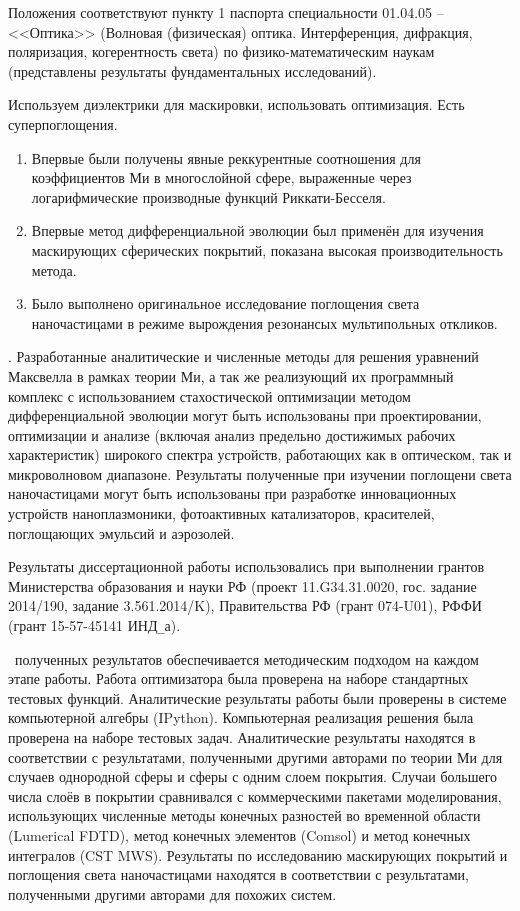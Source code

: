 Положения соответствуют пункту 1 паспорта специальности 01.04.05 --
<<Оптика>> (Волновая (физическая) оптика. Интерференция, дифракция,
поляризация, когерентность света) по физико-математическим
наукам (представлены результаты фундаментальных исследований).

\novelty Используем диэлектрики для маскировки, использовать
оптимизация. Есть суперпоглощения.
\begin{enumerate}
  \item Впервые были получены явные реккурентные соотношения для
    коэффициентов Ми в многослойной сфере, выраженные через
    логарифмические производные функций Риккати-Бесселя. 
  \item Впервые метод дифференциальной эволюции был применён
    для изучения маскирующих сферических покрытий, показана высокая
    производительность метода.
  \item Было выполнено оригинальное исследование поглощения света
    наночастицами в режиме вырождения резонансых мультипольных откликов.
\end{enumerate}

\influence. Разработанные аналитические и численные методы для решения
уравнений Максвелла в рамках теории Ми, а так же реализующий их
программный комплекс с использованием стахостической оптимизации
методом дифференциальной эволюции могут быть использованы при
проектировании, оптимизации и анализе (включая анализ предельно
достижимых рабочих характеристик) широкого спектра устройств,
работающих как в оптическом, так и микроволновом диапазоне. Результаты
полученные при изучении поглощени света наночастицами могут быть
использованы при разработке инновационных устройств наноплазмоники,
фотоактивных катализаторов, красителей, поглощающих эмульсий и
аэрозолей.

Результаты диссертационной работы использовались при выполнении
грантов Министерства образования и науки РФ
(проект 11.G34.31.0020, гос. задание 2014/190, задание 3.561.2014/K),
Правительства РФ (грант 074-U01), РФФИ (грант 15-57-45141 ИНД\verb+_+а).


\reliability\ полученных результатов обеспечивается методическим
подходом на каждом этапе работы. Работа оптимизатора была проверена на
наборе стандартных тестовых функций. Аналитические результаты работы
были проверены в системе компьютерной алгебры (IPython). Компьютерная
реализация решения была проверена на наборе тестовых
задач. Аналитические результаты находятся в соответствии с
результатами, полученными другими авторами по теории Ми для случаев
однородной сферы и сферы с одним слоем покрытия.  Случаи большего
числа слоёв в покрытии сравнивался с коммерческими пакетами
моделирования, использующих численные методы конечных разностей во
временной области (Lumerical FDTD), метод конечных элементов (Comsol)
и метод конечных интегралов (CST MWS). Результаты по исследованию
маскирующих покрытий и поглощения света наночастицами находятся в
соответствии с результатами, полученными другими авторами для похожих
систем.

